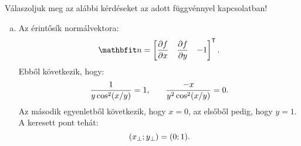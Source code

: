 \documentclass[exercise]{math-standalone}
\begin{document}
\begin{exercise}{%
    Válaszoljuk meg az alábbi kérdéseket az adott függvénnyel kapcsolatban!
  }
{\begin{enumerate}[a)]
\[\begin{bmatrix}
              1 \\ -\pi
            \end{bmatrix}^{\mathsf T}
            \begin{bmatrix}
              3/5 \\ -4/5
            \end{bmatrix}
            = \frac{3 + 4\pi}{5}
            \text.
          \]
          Az érintő egyenlete ezek alapján:
          \[
            \frac{x - \pi}{3/5} = \frac{y - 1}{-4/5} = \frac{z - 0}{(3 + 4\pi)/5}
            \text.
          \]
    \item Az érintősík normálvektora:
          \[
            \rvec n = \begin{bmatrix}
              \displaystyle\pdv{f}{x} & \displaystyle\pdv{f}{y} & -1
            \end{bmatrix}^{\mathsf T}
            \text.
          \]
          Ebből következik, hogy:
          \[
            \dfrac{1}{y \cos^2(x / y)} = 1
            \text,\qquad
            \dfrac{-x}{y^2 \cos^2(x / y)} = 0
            \text.
          \]
          Az második egyenletből következik, hogy $x = 0$, az elsőből pedig,
          hogy $y = 1$. A keresett pont tehát:
          \[
            (x_\perp; y_\perp) = (0; 1)
            \text.
          \]
  \end{enumerate}
  }
\end{exercise}
\end{document}
